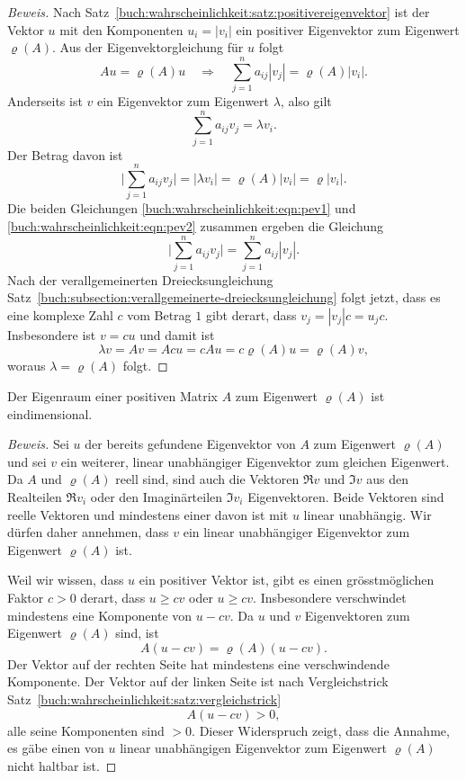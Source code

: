 \begin{proof}[Beweis]
Nach Satz~\ref{buch:wahrscheinlichkeit:satz:positivereigenvektor}
ist der Vektor $u$ mit den Komponenten $u_i=|v_i|$ ein positiver
Eigenvektor zum Eigenwert $\varrho(A)$.
Aus der Eigenvektorgleichung für $u$ folgt
\begin{equation}
Au = \varrho(A) u
\quad\Rightarrow\quad
\sum_{j=1}^n a_{ij}|v_j| = \varrho(A) |v_i|.
\label{buch:wahrscheinlichkeit:eqn:pev1}
\end{equation}
Anderseits ist $v$ ein Eigenvektor zum Eigenwert $\lambda$, also gilt
\[
\sum_{j=1}^n a_{ij}v_j = \lambda v_i.
\]
Der Betrag davon ist
\begin{equation}
\biggl|
\sum_{j=1}^n a_{ij}v_j
\biggr|
=
|\lambda v_i|
=
\varrho(A) |v_i|
=
\varrho |v_i|.
\label{buch:wahrscheinlichkeit:eqn:pev2}
\end{equation}
Die beiden Gleichungen
\eqref{buch:wahrscheinlichkeit:eqn:pev1}
und
\eqref{buch:wahrscheinlichkeit:eqn:pev2}
zusammen ergeben die Gleichung
\[
\biggl|
\sum_{j=1}^n a_{ij}v_j
\biggr|
=
\sum_{j=1}^n a_{ij}|v_j|.
\]
Nach der verallgemeinerten Dreiecksungleichung
Satz~\ref{buch:subsection:verallgemeinerte-dreiecksungleichung}
folgt jetzt, dass es eine komplexe Zahl $c$ vom Betrag $1$ gibt derart,
dass $v_j = |v_j|c=u_jc$.
Insbesondere ist $v=cu$ und damit ist 
\[
\lambda v = Av = Acu = c Au = c\varrho(A) u = \varrho(A) v,
\]
woraus $\lambda=\varrho(A)$ folgt.
\end{proof}

\begin{satz}
\label{buch:wahrscheinlichkeit:satz:geometrischeinfach}
Der Eigenraum einer positiven Matrix $A$ zum Eigenwert $\varrho(A)$ ist
eindimensional.
\end{satz}

\begin{proof}[Beweis]
Sei $u$ der bereits gefundene Eigenvektor von $A$ zum Eigenwert $\varrho(A)$
und sei $v$ ein weiterer, linear unabhängiger Eigenvektor zum
gleichen Eigenwert.
Da $A$ und $\varrho(A)$ reell sind, sind auch die Vektoren $\Re v$ und $\Im v$
aus den Realteilen $\Re v_i$ oder den Imaginärteilen $\Im v_i$ Eigenvektoren.
Beide Vektoren sind reelle Vektoren und mindestens einer davon ist mit
$u$ linear unabhängig.
Wir dürfen daher annehmen, dass $v$ ein linear unabhängiger Eigenvektor
zum Eigenwert $\varrho(A)$ ist.

Weil wir wissen, dass $u$ ein positiver Vektor ist, gibt es einen
grösstmöglichen Faktor $c>0$ derart, dass $u\ge cv$ oder $u\ge cv$.
Insbesondere verschwindet mindestens eine Komponente von $u-cv$.
Da $u$ und $v$ Eigenvektoren zum Eigenwert $\varrho(A)$ sind,
ist 
\[
A(u-cv)
=
\varrho(A)(u-cv).
\]
Der Vektor auf der rechten Seite hat mindestens eine verschwindende 
Komponente.
Der Vektor auf der linken Seite ist nach Vergleichstrick
Satz~\ref{buch:wahrscheinlichkeit:satz:vergleichstrick}
\[
A(u-cv) > 0,
\]
alle seine Komponenten sind $>0$.
Dieser Widerspruch zeigt, dass die Annahme, es gäbe einen von $u$ linear 
unabhängigen Eigenvektor zum Eigenwert $\varrho(A)$ nicht haltbar ist.
\end{proof}


